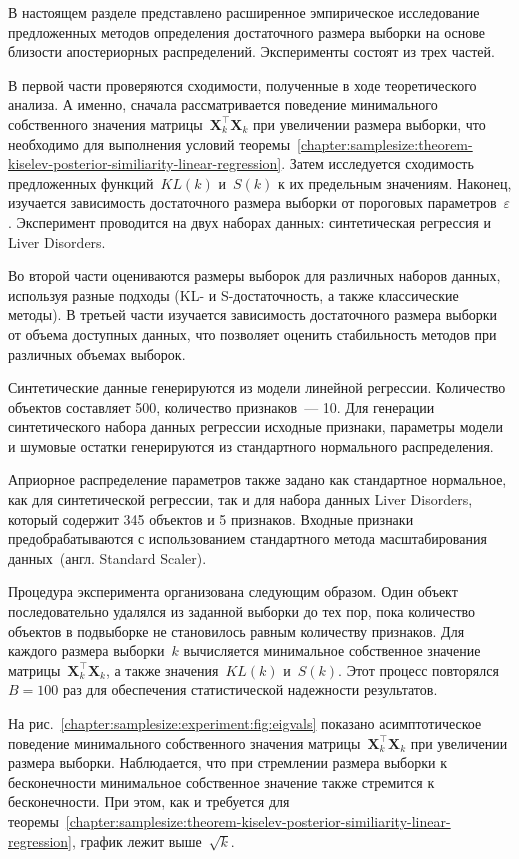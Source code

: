 В настоящем разделе представлено расширенное эмпирическое исследование предложенных методов определения достаточного размера выборки на основе близости апостериорных распределений. Эксперименты состоят из трех частей.

В первой части проверяются сходимости, полученные в ходе теоретического анализа. А именно, сначала рассматривается поведение минимального собственного значения матрицы~$\mathbf{X}_k^\top \mathbf{X}_k$ при увеличении размера выборки, что необходимо для выполнения условий теоремы~\ref{chapter:samplesize:theorem-kiselev-posterior-similiarity-linear-regression}. Затем исследуется сходимость предложенных функций~$KL(k)$ и~$S(k)$ к их предельным значениям. Наконец, изучается зависимость достаточного размера выборки от пороговых параметров~$\varepsilon$. Эксперимент проводится на двух наборах данных: синтетическая регрессия и Liver Disorders.

Во второй части оцениваются размеры выборок для различных наборов данных, используя разные подходы (KL- и S-достаточность, а также классические методы). В третьей части изучается зависимость достаточного размера выборки от объема доступных данных, что позволяет оценить стабильность методов при различных объемах выборок.

Синтетические данные генерируются из модели линейной регрессии. Количество объектов составляет 500, количество признаков~--- 10. Для генерации синтетического набора данных регрессии исходные признаки, параметры модели и шумовые остатки генерируются из стандартного нормального распределения.

Априорное распределение параметров также задано как стандартное нормальное, как для синтетической регрессии, так и для набора данных Liver Disorders, который содержит 345 объектов и 5 признаков. Входные признаки предобрабатываются с использованием стандартного метода масштабирования данных~(англ. Standard Scaler).

Процедура эксперимента организована следующим образом. Один объект последовательно удалялся из заданной выборки до тех пор, пока количество объектов в подвыборке не становилось равным количеству признаков. Для каждого размера выборки~$k$ вычисляется минимальное собственное значение матрицы~$\mathbf{X}_k^\top \mathbf{X}_k$, а также значения~$KL(k)$ и~$S(k)$. Этот процесс повторялся~$B=100$ раз для обеспечения статистической надежности результатов.

На рис.~\ref{chapter:samplesize:experiment:fig:eigvals} показано асимптотическое поведение минимального собственного значения матрицы~$\mathbf{X}_k^\top \mathbf{X}_k$ при увеличении размера выборки.
Наблюдается, что при стремлении размера выборки к бесконечности минимальное собственное значение также стремится к бесконечности.
При этом, как и требуется для теоремы~\ref{chapter:samplesize:theorem-kiselev-posterior-similiarity-linear-regression}, график лежит выше~$\sqrt{k}$.


